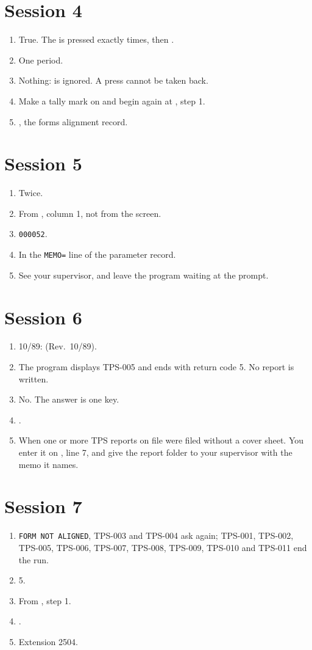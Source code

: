 \section{Session 4}
\begin{enumerate}
\item True.  The  is pressed exactly 
  times, then .
\item One period.
\item Nothing:  is ignored.  A press cannot be taken back.
\item Make a tally mark on  and begin again at , step 1.
\item {}, the forms alignment record.
\end{enumerate}

\section{Session 5}
\begin{enumerate}
\item Twice.
\item From , column 1, not from the screen.
\item \texttt{000052}.
\item In the \texttt{MEMO=} line of the parameter record.
\item See your supervisor, and leave the program waiting at the prompt.
\end{enumerate}

\section{Session 6}
\begin{enumerate}
\item 10/89:  (Rev.\ 10/89).
\item The program displays TPS-005 and ends with return code 5.  No report
  is written.
\item No.  The answer is one key.
\item {}.
\item When one or more TPS reports on file were filed without a cover sheet.
  You enter it on , line 7, and give the report folder to your
  supervisor with the memo it names.
\end{enumerate}

\section{Session 7}
\begin{enumerate}
\item \texttt{FORM NOT ALIGNED}, TPS-003 and TPS-004 ask again; TPS-001,
  TPS-002, TPS-005, TPS-006, TPS-007, TPS-008, TPS-009, TPS-010 and
  TPS-011 end the run.
\item 5.
\item From , step 1.
\item {}.
\item Extension 2504.
\end{enumerate}
